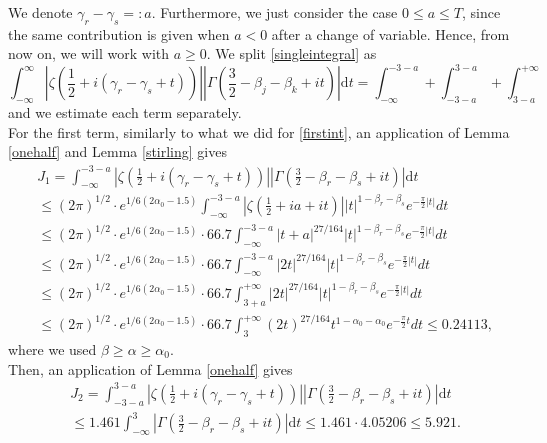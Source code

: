 \documentclass[reqno]{amsart}
\numberwithin{equation}{section}
\theoremstyle{remark}
\begin{document}
We denote $\gamma_r-\gamma_s=:a.$  Furthermore, we just consider the case $0\le a\le T$, since the same contribution is given when $a<0$ after a change of  variable. Hence, from now on, we will work with $a\ge0$. We split \eqref{singleintegral} as
\begin{equation*}
     \int_{-\infty}^{\infty}\left|\zeta\left(\frac{1}{2}+i(\gamma_r-\gamma_s+t)\right)\right|\left|\Gamma\left(\frac{3}{2}-\beta_j-\beta_k+it\right)\right|\text{d}t=\int_{-\infty}^{-3-a}+\int_{-3-a}^{3-a}+\int_{3-a}^{+\infty}
\end{equation*}
and we estimate each term separately.\\
For the first term, similarly to what we did for \eqref{firstint}, an application of Lemma \ref{onehalf} and Lemma \ref{stirling} gives
\begin{equation}\label{firstintrhs}
 \begin{aligned}
     &   J_1=\int_{- \infty}^{-3-a} \left|\zeta\left(\frac{1}{2}+i(\gamma_r-\gamma_s+t)\right)\right|\left|\Gamma\left(\frac{3}{2}-\beta_r-\beta_s+it\right)\right|\text{d} t\\&\le (2\pi)^{1/2}\cdot e^{1/6(2\alpha_0-1.5)} \int_{-\infty}^{-3-a}\left|\zeta\left(\frac{1}{2}+ia+it\right)\right||t|^{1-\beta_r-\beta_s}e^{-\frac{\pi}{2}|t|}dt \\&\le (2\pi)^{1/2}\cdot  e^{1/6(2\alpha_0-1.5)}\cdot 66.7 \int_{-\infty}^{-3-a}|t+a|^{ 27/164}|t|^{1-\beta_r-\beta_s}e^{-\frac{\pi}{2}|t|}dt\\&\le (2\pi)^{1/2}\cdot  e^{1/6(2\alpha_0-1.5)}\cdot 66.7 \int_{-\infty}^{-3-a}\left|2t\right|^{ 27/164}|t|^{1-\beta_r-\beta_s}e^{-\frac{\pi}{2}|t|}dt\\&\le (2\pi)^{1/2}\cdot  e^{1/6(2\alpha_0-1.5)}\cdot 66.7 \int_{3+a}^{+\infty}\left|2t\right|^{ 27/164}|t|^{1-\beta_r-\beta_s}e^{-\frac{\pi}{2}|t|}dt\\&\le (2\pi)^{1/2}\cdot  e^{1/6(2\alpha_0-1.5)}\cdot 66.7 \int_{3}^{+\infty}(2t)^{ 27/164}t^{1-\alpha_0-\alpha_0}e^{-\frac{\pi}{2}t}dt\le 0.24113,
    \end{aligned}
\end{equation}
where we used $\beta\ge\alpha\ge\alpha_0$.\\
Then, an application of Lemma \ref{onehalf} gives
\begin{equation}\label{secondintrhs}
    \begin{aligned}
     &J_2=\int_{-3-a}^{3-a} \left|\zeta\left(\frac{1}{2}+i(\gamma_r-\gamma_s+t)\right)\right|\left|\Gamma\left(\frac{3}{2}-\beta_r-\beta_s+it\right)\right|\text{d} t\\&\le  1.461\int_{-\infty}^{3}\left|\Gamma\left(\frac{3}{2}-\beta_r-\beta_s+it\right)\right|\text{d} t\le 1.461\cdot 4.05206\le 5.921.
    \end{aligned}
\end{equation}
\end{document}
